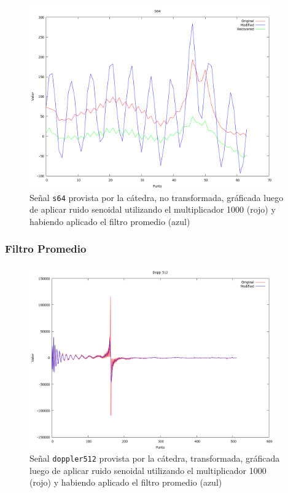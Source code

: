 \begin{figure}[H]
\begin {center}
\includegraphics[width=299pt]{imagenes/s64-sin100-exp.png}
\end {center}
\caption{Se\~nal \texttt{s64} provista por la c\'atedra, no transformada, gr\'aficada
luego de aplicar ruido senoidal utilizando el multiplicador 1000 (rojo) y 
habiendo aplicado el filtro promedio (azul)}
\label{fig:SexpSig}
\end{figure}


\subsubsection{Filtro Promedio}


\begin{figure}[H]
\begin {center}
\includegraphics[width=299pt]{imagenes/dopp512-sin100-avg-spec.png}
\end {center}
\caption{Se\~nal \texttt{doppler512} provista por la c\'atedra, transformada, gr\'aficada
luego de aplicar ruido senoidal utilizando el multiplicador 1000 (rojo) y 
habiendo aplicado el filtro promedio (azul)}
\label{fig:SinProm}
\end{figure}

